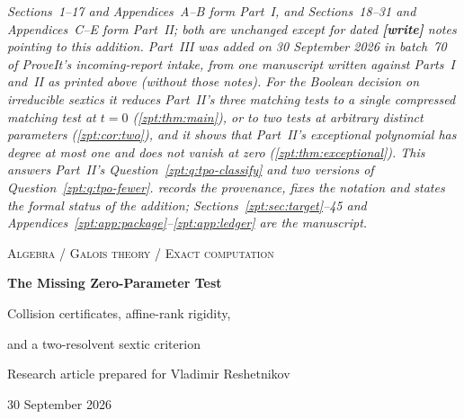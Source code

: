 \documentclass[11pt,letterpaper]{article}
\numberwithin{equation}{section}
\theoremstyle{definition}
\theoremstyle{remark}
\begin{document}
\noindent\emph{Sections~1--17 and Appendices~A--B form Part~I, and
Sections~18--31 and Appendices~C--E form Part~II; both are unchanged except
for dated \textbf{[write]} notes pointing to this addition. Part~III was
added on 30 September 2026 in batch~70 of ProveIt's incoming-report intake,
from one manuscript written against Parts~I and~II as printed above (without
those notes). For the Boolean decision on irreducible sextics it reduces
Part~II's three matching tests to a single compressed matching test at
$t=0$ (\cref{zpt:thm:main}), or to two tests at arbitrary distinct
parameters (\cref{zpt:cor:two}), and it shows that Part~II's exceptional
polynomial has degree at most one and does not vanish at zero
(\cref{zpt:thm:exceptional}). This answers Part~II's
Question~\ref{zpt:q:tpo-classify} and two versions of
Question~\ref{zpt:q:tpo-fewer}.  records the
provenance, fixes the notation and states the formal status of the
addition; Sections~\ref{zpt:sec:target}--45 and
Appendices~\ref{zpt:app:package}--\ref{zpt:app:ledger} are the manuscript.}

\begin{center}
{\color{MidnightBlue}\large\scshape Algebra / Galois theory / Exact computation\par}
\vspace{0.2in}
{\LARGE\bfseries The Missing Zero-Parameter Test\par}
\vspace{0.12in}
{\Large Collision certificates, affine-rank rigidity,\par and a two-resolvent sextic criterion\par}
\vspace{0.12in}
{Research article prepared for Vladimir Reshetnikov\par 30 September 2026\par}
\end{center}
\end{document}
